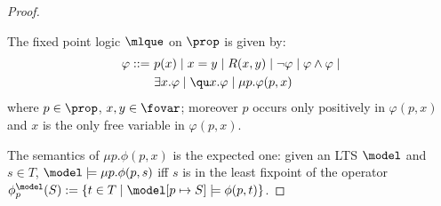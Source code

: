\begin{proof}
\begin{definition}
The fixed point logic $\mlque$ on $\prop$ is given by:
\begin{align*}
\varphi ::=\ & p(x) \mid x=y \mid R(x,y) \mid \lnot\varphi \mid \varphi \land \varphi \mid\\
& \exists x.\varphi \mid \qu x.\varphi \mid \mu p.\varphi(p,x)
\end{align*}
%
where $p\in\prop$, $x,y\in\fovar$; moreover $p$ occurs only positively in $\varphi(p,x)$ and $x$ is the only free variable in $\varphi(p,x)$.
\end{definition}


The semantics of $\mu p. \phi(p, x)$ is the expected one: given an LTS $\model$ and $s \in T$,  $\model \models \mu p. \phi(p, s)$ iff $s$ is in the least fixpoint of the operator
$\phi^\model_p(S) := \{t \in T \mid \model[p \mapsto S] \models \phi(p, t) \}$.%




\end{proof}
